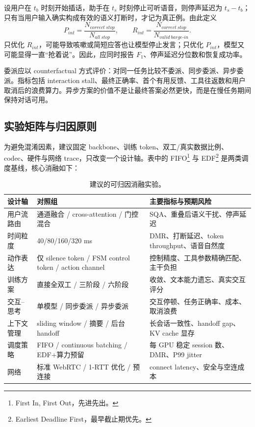 \documentclass[UTF8,fontset=none,a4paper,10pt]{ctexart}
\begin{document}
设用户在 $t_b$ 时刻开始插话，助手在 $t_s$ 时刻停止可听语音，则停声延迟为 $t_s-t_b$；只有当用户输入确实构成有效的语义打断时，才记为真正例。由此定义
\begin{equation}
P_{int}=\frac{N_{correct\ stop}}{N_{all\ stop}},\qquad
R_{int}=\frac{N_{correct\ stop}}{N_{valid\ barge\mbox{-}in}}.
\end{equation}
只优化 $R_{int}$，可能导致咳嗽或简短应答也让模型停止发言；只优化 $P_{int}$，模型又可能显得一直“抢着说”。因此，应同时报告 $F_1$、停声延迟分位数和恢复成功率。

委派应以 counterfactual 方式评价：对同一任务比较不委派、同步委派、异步委派。指标包括 interaction stall、最终正确率、首个有用反馈、工具往返数和用户取消后的浪费算力。异步方案的价值不是让最终答案必然更快，而是在慢任务期间保持对话可用。

\subsection{实验矩阵与归因原则}

为避免混淆因素，建议固定 backbone、训练 token、双工/真实数据比例、codec、硬件与网络 trace，只改变一个设计轴。表中的 FIFO\footnote{First In, First Out，先进先出。} 与 EDF\footnote{Earliest Deadline First，最早截止期优先。} 是两类调度基线，核心消融如下：

\begin{table}[H]
\centering\small
\caption{建议的可归因消融实验。}
\begin{tabularx}{\textwidth}{p{3.0cm}p{4.0cm}X}
\toprule
设计轴 & 对照组 & 主要指标与预期风险 \\
\midrule
用户流路由 & 通道融合 / cross-attention / 门控混合 & SQA、重叠后语义干扰、停声延迟 \\
时间粒度 & 40/80/160/320 ms & DMR、打断延迟、token throughput、语音自然度 \\
动作表达 & 仅 silence token / FSM control token / action channel & 控制精度、工具参数精确匹配、主干负担 \\
训练方案 & 直接全双工 / 三阶段 / 六阶段 & 收敛、文本能力遗忘、真实交互评分 \\
交互--思考 & 单模型 / 同步委派 / 异步委派 & 交互停顿、任务正确率、成本、取消浪费 \\
上下文管理 & sliding window / 摘要 / 后台 handoff & 长会话一致性、handoff gap、KV cache 显存 \\
调度策略 & FIFO / continuous batching / EDF+算力预留 & 每 GPU 稳定 session 数、DMR、P99 jitter \\
网络 & 标准 WebRTC / 1-RTT 优化 / 预连接 & connect latency、安全与空连成本 \\
\bottomrule
\end{tabularx}
\end{table}
\end{document}

